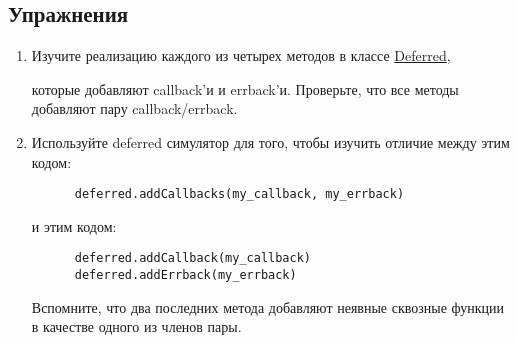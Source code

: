 \subsection{Упражнения}

\begin{enumerate}

\item Изучите реализацию каждого из четырех методов в классе 
\href{http://twistedmatrix.com/trac/browser/tags/releases/twisted-8.2.0/twisted/internet/defer.py#L172}{Deferred}, 
 
которые добавляют callback'и и errback'и. Проверьте, что все методы 
добавляют пару callback/errback. 

\item Используйте deferred симулятор для того, чтобы изучить отличие между этим кодом:


 \begin{verbatim}
      deferred.addCallbacks(my_callback, my_errback)
\end{verbatim} 


и этим кодом:


 \begin{verbatim}
      deferred.addCallback(my_callback)
      deferred.addErrback(my_errback)
\end{verbatim} 


Вспомните, что два последних метода добавляют неявные сквозные 
функции в качестве одного из членов пары.

\end{enumerate}

